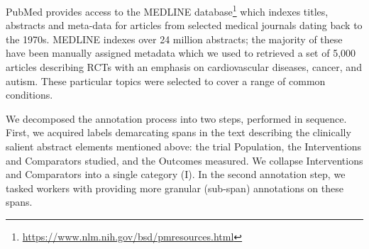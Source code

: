 \documentclass[11pt,a4paper]{article}
\begin{document}

PubMed provides access to the MEDLINE database\footnote{\url{https://www.nlm.nih.gov/bsd/pmresources.html}} which indexes titles, abstracts and meta-data for articles from selected medical journals dating back to the 1970s. MEDLINE indexes over 24 million abstracts; the majority of these have been manually assigned metadata which we used to retrieved a set of 5,000 articles describing RCTs with an emphasis on cardiovascular diseases, cancer, and autism. These particular topics were selected to cover a range of common conditions.



We decomposed the annotation process into two steps, performed in sequence. First, we acquired labels demarcating spans in the text describing the clinically salient abstract elements mentioned above: the trial Population, the Interventions and Comparators studied, and the Outcomes measured. We collapse Interventions and Comparators into a single category (I).
In the second annotation step, we tasked workers with providing more granular (sub-span) annotations on these spans. 
\end{document}
